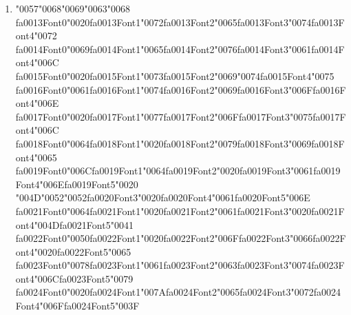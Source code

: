 \documentclass[12pt]{article}
\begin{document}
\begin{enumerate}[label=Q\arabic*.]
\item {\char"0057}{\char"0068}{\char"0069}{\char"0063}{\char"0068} {\csname fa0013Font0\endcsname\char"0020}{\csname fa0013Font1\endcsname\char"0072}{\csname fa0013Font2\endcsname\char"0065}{\csname fa0013Font3\endcsname\char"0074}{\csname fa0013Font4\endcsname\char"0072} {\csname fa0014Font0\endcsname\char"0069}{\csname fa0014Font1\endcsname\char"0065}{\csname fa0014Font2\endcsname\char"0076}{\csname fa0014Font3\endcsname\char"0061}{\csname fa0014Font4\endcsname\char"006C} {\csname fa0015Font0\endcsname\char"0020}{\csname fa0015Font1\endcsname\char"0073}{\csname fa0015Font2\endcsname\char"0069}{\char"0074}{\csname fa0015Font4\endcsname\char"0075} {\csname fa0016Font0\endcsname\char"0061}{\csname fa0016Font1\endcsname\char"0074}{\csname fa0016Font2\endcsname\char"0069}{\csname fa0016Font3\endcsname\char"006F}{\csname fa0016Font4\endcsname\char"006E} {\csname fa0017Font0\endcsname\char"0020}{\csname fa0017Font1\endcsname\char"0077}{\csname fa0017Font2\endcsname\char"006F}{\csname fa0017Font3\endcsname\char"0075}{\csname fa0017Font4\endcsname\char"006C} {\csname fa0018Font0\endcsname\char"0064}{\csname fa0018Font1\endcsname\char"0020}{\csname fa0018Font2\endcsname\char"0079}{\csname fa0018Font3\endcsname\char"0069}{\csname fa0018Font4\endcsname\char"0065} {\csname fa0019Font0\endcsname\char"006C}{\csname fa0019Font1\endcsname\char"0064}{\csname fa0019Font2\endcsname\char"0020}{\csname fa0019Font3\endcsname\char"0061}{\csname fa0019Font4\endcsname\char"006E}{\csname fa0019Font5\endcsname\char"0020} {\char"004D}{\char"0052}{\char"0052}{\csname fa0020Font3\endcsname\char"0020}{\csname fa0020Font4\endcsname\char"0061}{\csname fa0020Font5\endcsname\char"006E} {\csname fa0021Font0\endcsname\char"0064}{\csname fa0021Font1\endcsname\char"0020}{\csname fa0021Font2\endcsname\char"0061}{\csname fa0021Font3\endcsname\char"0020}{\csname fa0021Font4\endcsname\char"004D}{\csname fa0021Font5\endcsname\char"0041} {\csname fa0022Font0\endcsname\char"0050}{\csname fa0022Font1\endcsname\char"0020}{\csname fa0022Font2\endcsname\char"006F}{\csname fa0022Font3\endcsname\char"0066}{\csname fa0022Font4\endcsname\char"0020}{\csname fa0022Font5\endcsname\char"0065} {\csname fa0023Font0\endcsname\char"0078}{\csname fa0023Font1\endcsname\char"0061}{\csname fa0023Font2\endcsname\char"0063}{\csname fa0023Font3\endcsname\char"0074}{\csname fa0023Font4\endcsname\char"006C}{\csname fa0023Font5\endcsname\char"0079} {\csname fa0024Font0\endcsname\char"0020}{\csname fa0024Font1\endcsname\char"007A}{\csname fa0024Font2\endcsname\char"0065}{\csname fa0024Font3\endcsname\char"0072}{\csname fa0024Font4\endcsname\char"006F}{\csname fa0024Font5\endcsname\char"003F}

\end{enumerate}
\end{document}
